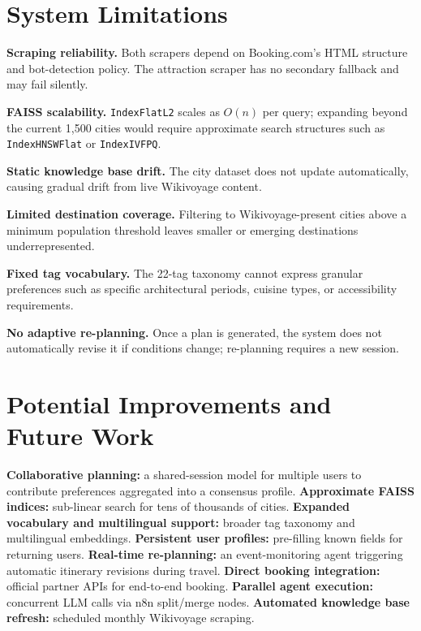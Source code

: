 \documentclass[12pt,a4paper]{report}
\begin{document}
\section{System Limitations}

\textbf{Scraping reliability.} Both scrapers depend on Booking.com's HTML structure and bot-detection
policy. The attraction scraper has no secondary fallback and may fail silently.

\textbf{FAISS scalability.} \texttt{IndexFlatL2} scales as $O(n)$ per query; expanding beyond
the current 1,500 cities would require approximate search structures such as \texttt{IndexHNSWFlat}
or \texttt{IndexIVFPQ}.

\textbf{Static knowledge base drift.} The city dataset does not update automatically, causing
gradual drift from live Wikivoyage content.

\textbf{Limited destination coverage.} Filtering to Wikivoyage-present cities above a minimum
population threshold leaves smaller or emerging destinations underrepresented.

\textbf{Fixed tag vocabulary.} The 22-tag taxonomy cannot express granular preferences such as
specific architectural periods, cuisine types, or accessibility requirements.

\textbf{No adaptive re-planning.} Once a plan is generated, the system does not automatically revise
it if conditions change; re-planning requires a new session.

\section{Potential Improvements and Future Work}

\textbf{Collaborative planning:} a shared-session model for multiple users to contribute preferences
aggregated into a consensus profile. \textbf{Approximate FAISS indices:} sub-linear search for
tens of thousands of cities. \textbf{Expanded vocabulary and multilingual support:} broader tag
taxonomy and multilingual embeddings. \textbf{Persistent user profiles:} pre-filling known fields
for returning users. \textbf{Real-time re-planning:} an event-monitoring agent triggering automatic
itinerary revisions during travel. \textbf{Direct booking integration:} official partner APIs for
end-to-end booking. \textbf{Parallel agent execution:} concurrent LLM calls via n8n split/merge
nodes. \textbf{Automated knowledge base refresh:} scheduled monthly Wikivoyage scraping.
\end{document}
